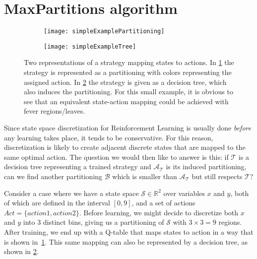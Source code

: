 \section{MaxPartitions algorithm}%
\label{sec:maxParts}

\begin {figure} [t!]

    \centering
    \begin{subfigure}{0.4\textwidth}
        \texttt{[image: simpleExamplePartitioning]}%
        \caption{}%
        \label{fig:simpleExamplePartitioning}
    \end{subfigure}
    \begin{subfigure}{0.4\textwidth}
      \texttt{[image: simpleExampleTree]}%
      \caption{}%
      \label{fig:simpleExampleTree}
    \end{subfigure}

  \caption{%
    Two representations of a strategy mapping states to actions. In
    \cref{fig:simpleExamplePartitioning} the strategy is represented as a
    partitioning with colors representing the assigned action. In
    \cref{fig:simpleExampleTree} the strategy is given as a decision
    tree, which also induces the partitioning. For this small example, it is
    obvious to see that an equivalent state-action mapping could be achieved
    with fever regions/leaves.
  }%
  \label{fig:simpleExample}

\end {figure}

Since state space discretization for Reinforcement Learning is usually done
\textit{before} any learning takes place, it tends to be conservative. For this
reason, discretization is likely to create adjacent discrete states that are
mapped to the same optimal action. The question we would then like to answer is
this: if $\mathcal{T}$ is a decision tree representing a trained strategy and
$\mathcal{A}_{\mathcal{T}}$ is its induced partitioning, can we find another
partitioning $\mathcal{B}$ which is smaller than $\mathcal{A}_{\mathcal{T}}$ but
still respects $\mathcal{T}$?

\begin {example}
Consider a case where we have a state space $\mathcal{S} \in
\mathbb{R}^2$ over variables $x$ and $y$, both of which are defined in the
interval $[0,9]$, and a set of actions $Act = \{ action1, action2 \}$. Before
learning, we might decide to discretize both $x$ and $y$ into 3 distinct bins,
giving us a partitioning of $\mathcal{S}$ with $3\times3 = 9$ regions. After
training, we end up with a Q-table that maps states to action in a way that is
shown in~\cref{fig:simpleExamplePartitioning}. This same mapping can also be
represented by a decision tree, as shown in \cref{fig:simpleExampleTree}.
\end {example}



